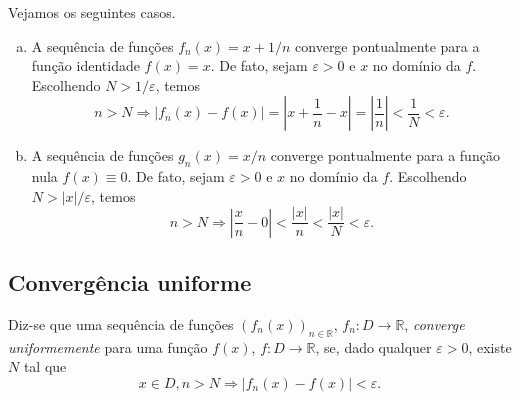 \begin{ex}\label{ex:convergencia_pontual}
  Vejamos os seguintes casos.
  \begin{enumerate}[a)]
  \item A sequência de funções $f_n(x) = x + 1/n$ converge pontualmente para a função identidade $f(x)=x$. De fato, sejam $\varepsilon>0$ e $x$ no domínio da $f$. Escolhendo $N > 1/\varepsilon$, temos
    \begin{equation}
      n>N \Rightarrow |f_n(x) - f(x)| = \left|x+\frac{1}{n} - x\right| = \left|\frac{1}{n}\right| < \frac{1}{N} < \varepsilon.
    \end{equation}
  \item A sequência de funções $g_n(x) = x/n$ converge pontualmente para a função nula $f(x) \equiv 0$. De fato, sejam $\varepsilon>0$ e $x$ no domínio da $f$. Escolhendo $N > |x|/\varepsilon$, temos
    \begin{equation}
      n>N \Rightarrow \left|\frac{x}{n} - 0\right| < \frac{|x|}{n} < \frac{|x|}{N} < \varepsilon.
    \end{equation}
  \end{enumerate}
\end{ex}

\subsection{Convergência uniforme}

\begin{defn}
  Diz-se que uma sequência de funções $(f_n(x))_{n\in\mathbb{R}}$, $f_n:D\to\mathbb{R}$, \emph{converge uniformemente} para uma função $f(x)$, $f:D\to\mathbb{R}$, se, dado qualquer $\varepsilon>0$, existe $N$ tal que
  \begin{equation}
    x\in D, n>N \Rightarrow |f_n(x)-f(x)|<\varepsilon.
  \end{equation}
\end{defn}

